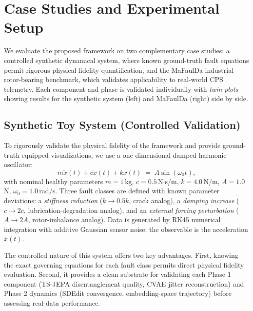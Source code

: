 \documentclass[conference]{IEEEtran}
\begin{document}
\section{Case Studies and Experimental Setup}
\label{sec:experiments}

We evaluate the proposed framework on two complementary case studies: a controlled synthetic dynamical system, where known ground-truth fault equations permit rigorous physical fidelity quantification, and the MaFaulDa industrial rotor-bearing benchmark, which validates applicability to real-world CPS telemetry. Each component and phase is validated individually with \emph{twin plots} showing results for the synthetic system (left) and MaFaulDa (right) side by side.

\subsection{Synthetic Toy System (Controlled Validation)}

To rigorously validate the physical fidelity of the framework and provide ground-truth-equipped visualizations, we use a one-dimensional damped harmonic oscillator:
\begin{equation}
  m\ddot{x}(t) + c\dot{x}(t) + kx(t) \;=\; A\sin(\omega_0 t),
  \label{eq:oscillator}
\end{equation}
with nominal healthy parameters $m{=}1$\,kg, $c{=}0.5$\,N$\cdot$s/m, $k{=}4.0$\,N/m, $A{=}1.0$\,N, $\omega_0{=}1.0$\,rad/s. Three fault classes are defined with known parameter deviations: a \emph{stiffness reduction} ($k\to 0.5k$, crack analog), a \emph{damping increase} ($c\to 2c$, lubrication-degradation analog), and an \emph{external forcing perturbation} ($A\to 2A$, rotor-imbalance analog). Data is generated by RK45 numerical integration with additive Gaussian sensor noise; the observable is the acceleration $\ddot{x}(t)$.

The controlled nature of this system offers two key advantages. First, knowing the exact governing equations for each fault class permits direct physical fidelity evaluation. Second, it provides a clean substrate for validating each Phase 1 component (TS-JEPA disentanglement quality, CVAE jitter reconstruction) and Phase 2 dynamics (SDEdit convergence, embedding-space trajectory) before assessing real-data performance.
\end{document}
